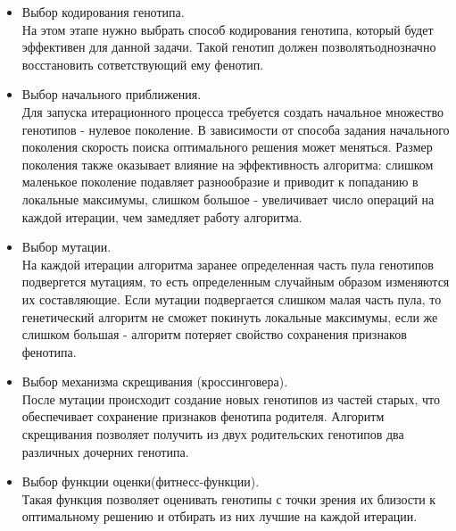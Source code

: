 \begin{itemize}
	\item Выбор кодирования генотипа.\\
На этом этапе нужно выбрать способ кодирования генотипа, который будет эффективен для данной задачи. Такой генотип должен позволятьоднозначно восстановить сответствующий ему фенотип.
	\item Выбор начального приближения.\\
Для запуска итерационного процесса требуется создать начальное множество генотипов - нулевое поколение. В зависимости от способа задания начального поколения скорость поиска оптимального решения может меняться. Размер поколения также оказывает влияние на эффективность алгоритма: слишком маленькое поколение подавляет разнообразие и приводит к попаданию в локальные максимумы, слишком большое - увеличивает число операций на каждой итерации, чем замедляет работу алгоритма.
	\item Выбор мутации.\\
На каждой итерации алгоритма заранее определенная часть пула генотипов подвергется мутациям, то есть определенным случайным образом изменяются их составляющие. Если мутации подвергается слишком малая часть пула, то генетический алгоритм не сможет покинуть локальные максимумы, если же слишком большая - алгоритм потеряет свойство сохранения признаков фенотипа.
	\item Выбор механизма скрещивания (кроссинговера).\\
После мутации происходит создание новых генотипов из частей старых, что обеспечивает сохранение признаков фенотипа родителя. Алгоритм скрещивания позволяет получить из двух родительских генотипов два различных дочерних генотипа.
	\item Выбор функции оценки(фитнесс-функции).\\
Такая функция позволяет оценивать генотипы с точки зрения их близости к оптимальному решению и отбирать из них лучшие на каждой итерации. 
\end{itemize}

